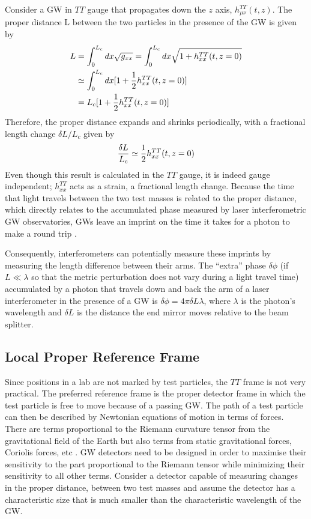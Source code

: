 \documentclass[binding=0.6cm, LaM]{sapthesis}
\begin{document}
        Consider a GW in $TT$ gauge that propagates down the $z$ axis, $h^{TT}_{\mu\nu}(t,z)$.
        The proper distance L between the two particles in the presence of the GW is given by
        \begin{align}
          \label{distance}
          L & = \int^{L_c}_{0}{dx\sqrt{g_{xx}}} = \int^{L_c}_{0}dx\sqrt{1 + h^{TT}_{xx}(t,z=0)} \\
          & \simeq \int^{L_c}_{0}{dx[1 + {1 \over 2}h^{TT}_{xx}(t,z=0)]} \\
          &= L_c[1 + {1 \over 2}h^{TT}_{xx}(t,z=0)]
        \end{align}
        Therefore, the proper distance expands and shrinks periodically, with a fractional length change $\delta L/L_c$ given by
        \begin{equation}
          {{\delta L}\over{L_c}} \simeq {1 \over 2} h_{xx}^{TT}(t,z=0)
        \end{equation}
        Even though this result is calculated in the $TT$ gauge, it is indeed gauge independent;
        $h_{xx}^{TT}$ acts as a strain, a fractional length change.
        Because the time that light travels between the two test masses is related to the proper distance,
        which directly relates to the accumulated phase measured by laser interferometric GW observatories,
        GWs leave an imprint on the time it takes for a photon to make a round trip \cite{4}.

        Consequently, interferometers can potentially measure these imprints by measuring the length difference between
        their arms. The “extra” phase $\delta \phi$ (if $L \ll \lambda$ so that the metric perturbation
	does not vary during a light travel time) accumulated by a photon that travels
        down and back the arm of a laser interferometer in the presence of a GW is $\delta \phi = 4\pi \delta L \lambda$,
        where $\lambda$ is the photon’s wavelength and $\delta L$ is the distance
        the end mirror moves relative to the beam splitter.

\subsection{Local Proper Reference Frame}
        Since positions in a lab are not marked by test particles,
        the $TT$ frame is not very practical.
        The preferred reference frame is the proper detector frame
        in which the test particle is free to move because of a passing GW.
        The path of a test particle can then be described by Newtonian equations of motion in terms of forces.
        There are terms proportional to the Riemann curvature tensor from the gravitational field of the Earth
        but also terms from static gravitational forces, Coriolis forces, etc \cite{5}.
	GW detectors need to be designed in order to maximise their sensitivity to the part proportional to the Riemann tensor while minimizing their sensitivity to all other terms.
        Consider a detector capable of measuring changes in the proper distance, between two test masses
        and assume the detector has a characteristic size that is much smaller
        than the characteristic wavelength of the GW.
\end{document}
